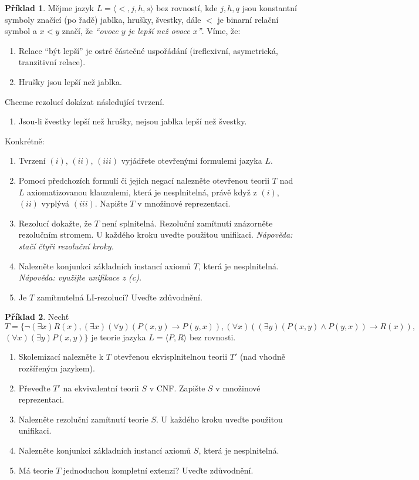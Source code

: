 \documentclass[a4paper]{article}
\theoremstyle{definition}
\newtheorem{problem}{Příklad}
\begin{document}
\medskip\begin{problem}
Mějme jazyk $L=\langle <, j, h, s\rangle$ bez rovností, kde $j,h,q$ jsou konstantní symboly značící (po řadě) jablka, hrušky, švestky, dále $<$ je binarní relační symbol a $x < y$ značí, že {\it ``ovoce $y$ je lepší než ovoce $x$''}. Víme, že:
\begin{enumerate}[label=(\roman*)]\it
    \item Relace ``být lepší'' je ostré částečné uspořádání (ireflexivní, asymetrická, tranzitivní relace).
    \item Hrušky jsou lepší než jablka.
\end{enumerate}
Chceme rezolucí dokázat následující tvrzení.
\begin{enumerate}[label=(\roman*)]\it
    \setcounter{enumi}{2}
    \item Jsou-li švestky lepší než hrušky, nejsou jablka lepší než švestky.
\end{enumerate}
\smallskip

Konkrétně:
\begin{enumerate}
\item Tvrzení $(i)$, $(ii)$, $(iii)$ vyjádřete otevřenými formulemi jazyka $L$.
\item Pomocí předchozích formulí či jejich negací nalezněte otevřenou teorii $T$ nad $L$ axiomatizovanou klauzulemi, která je nesplnitelná, právě když z $(i)$, $(ii)$ vyplývá $(iii)$. Napište $T$ v množinové reprezentaci.
\item Rezolucí dokažte, že $T$ není splnitelná. Rezoluční zamítnutí znázorněte rezolučním stromem. U každého kroku uveďte použitou unifikaci. {\it Nápověda: stačí čtyři rezoluční kroky.}
\item Nalezněte konjunkci základních instancí axiomů $T$, která je nesplnitelná. {\it Nápověda: využijte unifikace z (c).}
\item Je $T$ zamítnutelná LI-rezolucí? Uveďte zdůvodnění.
\end{enumerate}
\end{problem}


\medskip\begin{problem}
Nechť $T=\{\neg(\exists x) R(x), (\exists x)(\forall y)(P(x,y)\to P(y,x)), (\forall x)((\exists y)(P(x,y)\wedge P(y,x))\to R(x)),$ $(\forall x)(\exists y)P(x,y)\}$ je teorie jazyka $L=\langle P,R\rangle$ bez rovnosti.
\begin{enumerate}
\item Skolemizací nalezněte k $T$ otevřenou ekvisplnitelnou teorii $T'$ (nad vhodně rozšířeným jazykem).
\item Převeďte $T'$ na ekvivalentní teorii $S$ v CNF. Zapište $S$ v množinové reprezentaci.
\item Nalezněte rezoluční zamítnutí teorie $S$. U každého kroku uveďte použitou unifikaci.
\item Nalezněte konjunkci základních instancí axiomů $S$, která je nesplnitelná.
\item Má teorie $T$ jednoduchou kompletní extenzi? Uveďte zdůvodnění.
\end{enumerate}
\end{problem}
\end{document}
